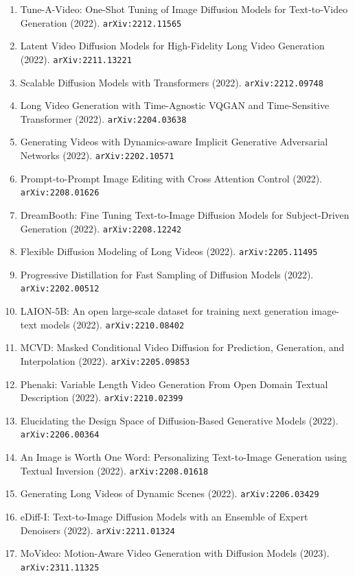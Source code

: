\documentclass[11pt]{article}
\begin{document}
\begin{enumerate}
  \item Tune-A-Video: One-Shot Tuning of Image Diffusion Models for
  Text-to-Video Generation (2022). \texttt{arXiv:2212.11565}
  \item Latent Video Diffusion Models for High-Fidelity Long Video Generation (2022). \texttt{arXiv:2211.13221}
  \item Scalable Diffusion Models with Transformers (2022). \texttt{arXiv:2212.09748}
  \item Long Video Generation with Time-Agnostic VQGAN and Time-Sensitive
  Transformer (2022). \texttt{arXiv:2204.03638}
  \item Generating Videos with Dynamics-aware Implicit Generative Adversarial
  Networks (2022). \texttt{arXiv:2202.10571}
  \item Prompt-to-Prompt Image Editing with Cross Attention Control (2022). \texttt{arXiv:2208.01626}
  \item DreamBooth: Fine Tuning Text-to-Image Diffusion Models for
  Subject-Driven Generation (2022). \texttt{arXiv:2208.12242}
  \item Flexible Diffusion Modeling of Long Videos (2022). \texttt{arXiv:2205.11495}
  \item Progressive Distillation for Fast Sampling of Diffusion Models (2022). \texttt{arXiv:2202.00512}
  \item LAION-5B: An open large-scale dataset for training next generation
  image-text models (2022). \texttt{arXiv:2210.08402}
  \item MCVD: Masked Conditional Video Diffusion for Prediction, Generation, and
  Interpolation (2022). \texttt{arXiv:2205.09853}
  \item Phenaki: Variable Length Video Generation From Open Domain Textual
  Description (2022). \texttt{arXiv:2210.02399}
  \item Elucidating the Design Space of Diffusion-Based Generative Models (2022). \texttt{arXiv:2206.00364}
  \item An Image is Worth One Word: Personalizing Text-to-Image Generation using
  Textual Inversion (2022). \texttt{arXiv:2208.01618}
  \item Generating Long Videos of Dynamic Scenes (2022). \texttt{arXiv:2206.03429}
  \item eDiff-I: Text-to-Image Diffusion Models with an Ensemble of Expert
  Denoisers (2022). \texttt{arXiv:2211.01324}
  \item MoVideo: Motion-Aware Video Generation with Diffusion Models (2023). \texttt{arXiv:2311.11325}

\end{enumerate}
\end{document}
